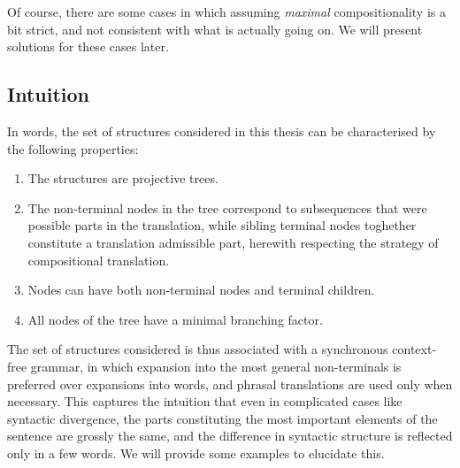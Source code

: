 \documentclass{report}
\begin{document}
Of course, there are some cases in which assuming \textit{maximal} compositionality is a bit strict, and not consistent with what is actually going on. We will present solutions for these cases later.

\subsection{Intuition}

In words, the set of structures considered in this thesis can be characterised by the following properties:
\begin{enumerate}
\item The structures are projective trees.
\item The non-terminal nodes in the tree correspond to subsequences that were possible parts in the translation, while sibling terminal nodes toghether constitute a translation admissible part, herewith respecting the strategy of compositional translation.
\item Nodes can have both non-terminal nodes and terminal children.
\item All nodes of the tree have a minimal branching factor.
\end{enumerate}

\noindent The set of structures considered is thus associated with a synchronous context-free grammar, in which expansion into the most general non-terminals is preferred over expansions into words, and phrasal translations are used only when necessary. This captures the intuition that even in complicated cases like syntactic divergence, the parts constituting the most important elements of the sentence are grossly the same, and the difference in syntactic structure is reflected only in a few words. We will provide some examples to elucidate this.
\end{document}
